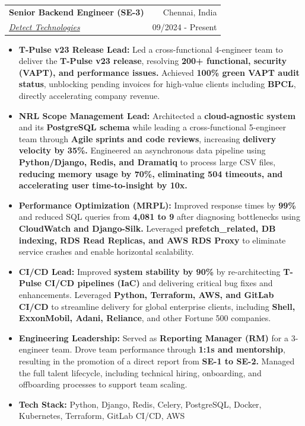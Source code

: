 \documentclass[letterpaper,11pt]{article}
\makeatletter
\newcommand{\resumeItem}[1]{
  \item\small{
    {#1 \vspace{-1pt}}
  }
}
\newcommand{\resumeSubheading}[4]{
  \vspace{-1pt}\item
    \begin{tabular*}{\textwidth}[t]{l@{\extracolsep{\fill}}r}
      \textbf{#1} & {\color{dark-grey}\small #2}\vspace{1pt}\\ %
      \textit{#3} & {\color{dark-grey} \small #4}\\ %
    \end{tabular*}\vspace{-4pt}
}
\newcommand{\resumeItemListStart}{\begin{itemize}}
\newcommand{\resumeItemListEnd}{\end{itemize}\vspace{0pt}}
\makeatother
\begin{document}
    \resumeSubheading
      {Senior Backend Engineer (SE-3)}{Chennai, India}
      {\href{https://detecttechnologies.com/}{Detect Technologies}}{09/2024 - Present}
      \resumeItemListStart
        \resumeItem{\textbf{T-Pulse v23 Release Lead:} Led a cross-functional 4-engineer team to deliver the \textbf{T-Pulse v23 release}, resolving \textbf{200+ functional, security (VAPT), and performance issues.} Achieved \textbf{100\% green VAPT audit status}, unblocking pending invoices for high-value clients including \textbf{BPCL}, directly accelerating company revenue.}
        \resumeItem{\textbf{NRL Scope Management Lead:} Architected a \textbf{cloud-agnostic system} and its \textbf{PostgreSQL schema} while leading a cross-functional 5-engineer team through \textbf{Agile sprints and code reviews}, increasing \textbf{delivery velocity by 35\%.} Engineered an asynchronous data pipeline using \textbf{Python/Django, Redis, and Dramatiq} to process large CSV files, \textbf{reducing memory usage by 70\%, eliminating 504 timeouts, and accelerating user time-to-insight by 10x.}}
        \resumeItem{\textbf{Performance Optimization (MRPL):} Improved response times by \textbf{99\%} and reduced SQL queries from \textbf{4,081 to 9} after diagnosing bottlenecks using \textbf{CloudWatch and Django-Silk.} Leveraged \textbf{prefetch\_related, DB indexing, RDS Read Replicas, and AWS RDS Proxy} to eliminate service crashes and enable horizontal scalability.}
        \resumeItem{\textbf{CI/CD Lead:} Improved \textbf{system stability by 90\%} by re-architecting \textbf{T-Pulse CI/CD pipelines (IaC)} and delivering critical bug fixes and enhancements. Leveraged \textbf{Python, Terraform, AWS, and GitLab CI/CD} to streamline delivery for global enterprise clients, including \textbf{Shell, ExxonMobil, Adani, Reliance}, and other Fortune 500 companies.}
        \resumeItem{\textbf{Engineering Leadership:} Served as \textbf{Reporting Manager (RM)} for a 3-engineer team. Drove team performance through \textbf{1:1s and mentorship}, resulting in the promotion of a direct report from \textbf{SE-1 to SE-2.} Managed the full talent lifecycle, including technical hiring, onboarding, and offboarding processes to support team scaling.}
        \resumeItem{\textbf{Tech Stack:} Python, Django, Redis, Celery, PostgreSQL, Docker, Kubernetes, Terraform, GitLab CI/CD, AWS}
      \resumeItemListEnd
\end{document}
